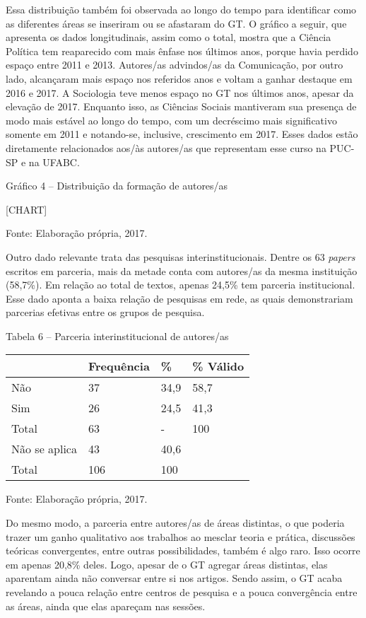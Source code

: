 Essa distribuição também foi observada ao longo do tempo para
identificar como as diferentes áreas se inseriram ou se afastaram do GT.
O gráfico a seguir, que apresenta os dados longitudinais, assim como o
total, mostra que a Ciência Política tem reaparecido com mais ênfase nos
últimos anos, porque havia perdido espaço entre 2011 e 2013. Autores/as
advindos/as da Comunicação, por outro lado, alcançaram mais espaço nos
referidos anos e voltam a ganhar destaque em 2016 e 2017. A Sociologia
teve menos espaço no GT nos últimos anos, apesar da elevação de 2017.
Enquanto isso, as Ciências Sociais mantiveram sua presença de modo mais
estável ao longo do tempo, com um decréscimo mais significativo somente
em 2011 e notando-se, inclusive, crescimento em 2017. Esses dados estão
diretamente relacionados aos/às autores/as que representam esse curso na
PUC-SP e na UFABC.

Gráfico 4 -- Distribuição da formação de autores/as

{{[}CHART{]}}

Fonte: Elaboração própria, 2017.

Outro dado relevante trata das pesquisas interinstitucionais. Dentre os
63 \emph{papers} escritos em parceria, mais da metade conta com
autores/as da mesma instituição (58,7\%). Em relação ao total de textos,
apenas 24,5\% tem parceria institucional. Esse dado aponta a baixa
relação de pesquisas em rede, as quais demonstrariam parcerias efetivas
entre os grupos de pesquisa.

Tabela 6 -- Parceria interinstitucional de autores/as

\begin{longtable}[]{@{}llll@{}}
\toprule
& Frequência & \% & \% Válido\tabularnewline
\midrule
\endhead
Não & 37 & 34,9 & 58,7\tabularnewline
Sim & 26 & 24,5 & 41,3\tabularnewline
Total & 63 & - & 100\tabularnewline
Não se aplica & 43 & 40,6 &\tabularnewline
Total & 106 & 100 &\tabularnewline
\bottomrule
\end{longtable}

Fonte: Elaboração própria, 2017.

Do mesmo modo, a parceria entre autores/as de áreas distintas, o que
poderia trazer um ganho qualitativo aos trabalhos ao mesclar teoria e
prática, discussões teóricas convergentes, entre outras possibilidades,
também é algo raro. Isso ocorre em apenas 20,8\% deles. Logo, apesar de
o GT agregar áreas distintas, elas aparentam ainda não conversar entre
si nos artigos. Sendo assim, o GT acaba revelando a pouca relação entre
centros de pesquisa e a pouca convergência entre as áreas, ainda que
elas apareçam nas sessões.


